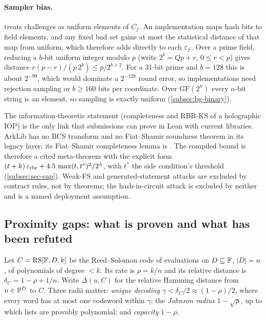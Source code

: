\paragraph{Sampler bias.}  treats challenges as uniform elements of $C_j$. An
implementation maps hash bits to field elements, and any fixed bad set gains at most the
statistical distance of that map from uniform, which therefore adds directly to each $\varepsilon_j$.
Over a prime field, reducing a $b$-bit uniform integer modulo $p$ (write $2^b=Qp+r$, $0\le r<p$)
gives distance $r(p-r)/(p\,2^b)\le p/2^{b+2}$. For a 31-bit prime and $b=128$ this is about
$2^{-99}$, which would dominate a $2^{-128}$ round error, so implementations need rejection
sampling or $b\ge160$ bits per coordinate. Over $\mathrm{GF}(2^n)$ every $n$-bit string is an
element, so sampling is exactly uniform (\cref{subsec:bg-binary}).

\begin{takeaway}
The information-theoretic statement (completeness and RBR-KS of a holographic IOP) is the only
link that submissions can prove in Lean with current libraries. ArkLib has no BCS transform and
no Fiat--Shamir soundness theorem in its legacy layer; its Fiat--Shamir completeness lemma is
. The compiled bound is therefore a cited meta-theorem with the explicit form
$(t+k)\,\varepsilon_{\mathrm{rbr}}+4.5\,\max(t,t^*)^2/2^\lambda$, with $t^*$ the side condition's threshold
(\cref{subsec:sec-cap}). Weak-FS and generated-statement attacks are excluded by contract rules,
not by theorems; the hash-in-circuit attack is excluded by neither and is a named deployment
assumption.
\end{takeaway}

\subsection{Proximity gaps: what is proven and what has been refuted}\label{subsec:bg-proximity}

Let $C=\mathrm{RS}[\mathbb{F},D,k]$ be the Reed--Solomon code of evaluations on $D\subseteq\mathbb{F}$, $|D|=n$, of
polynomials of degree $<k$. Its rate is $\rho=k/n$ and its relative distance is
$\delta_C=1-\rho+1/n$. Write $\Delta(u,C)$ for the relative Hamming distance from $u\in\mathbb{F}^D$ to
$C$. Three radii matter: \emph{unique decoding} $\gamma<\delta_C/2\approx(1-\rho)/2$, where every
word has at most one codeword within $\gamma$; the \emph{Johnson radius} $1-\sqrt\rho$, up to which
lists are provably polynomial; and \emph{capacity} $1-\rho$.

